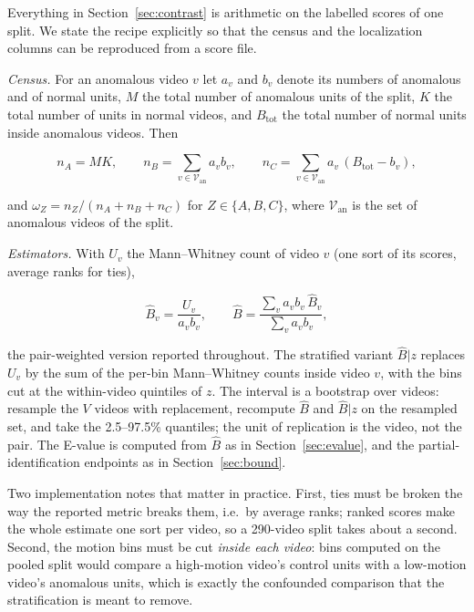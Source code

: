 \documentclass[number,preprint,12pt]{elsarticle}
\begin{document}
Everything in Section~\ref{sec:contrast} is arithmetic on the labelled scores of
one split. We state the recipe explicitly so that the census and the localization
columns can be reproduced from a score file.

\emph{Census.} For an anomalous video \(v\) let \(a_v\) and \(b_v\) denote its numbers of
anomalous and of normal units, \(M\) the total number of anomalous units of the
split, \(K\) the total number of units in normal videos, and \(B_{\mathrm{tot}}\) the
total number of normal units inside anomalous videos. Then

\begin{equation}
n_A=MK,\qquad
n_B=\sum_{v\in\mathcal{V}_{\mathrm{an}}} a_v b_v,\qquad
n_C=\sum_{v\in\mathcal{V}_{\mathrm{an}}} a_v\,(B_{\mathrm{tot}}-b_v),
\end{equation}

\noindent and \(\omega_Z=n_Z/(n_A+n_B+n_C)\) for \(Z\in\{A,B,C\}\), where
\(\mathcal{V}_{\mathrm{an}}\) is the set of anomalous videos of the split.

\emph{Estimators.} With \(U_v\) the Mann--Whitney count of video \(v\) (one sort of its
scores, average ranks for ties),

\begin{equation}
\hat{B}_v=\frac{U_v}{a_v b_v},\qquad
\hat{B}=\frac{\sum_v a_v b_v\,\hat{B}_v}{\sum_v a_v b_v},
\end{equation}

\noindent the pair-weighted version reported throughout. The stratified variant
\(\hat{B}|z\) replaces \(U_v\) by the sum of the per-bin Mann--Whitney counts
inside video \(v\), with the bins cut at the within-video quintiles of \(z\). The
interval is a bootstrap over videos: resample the \(V\) videos with replacement,
recompute \(\hat{B}\) and \(\hat{B}|z\) on the resampled set, and take the
2.5--97.5\% quantiles; the unit of replication is the video, not the pair. The
E-value is computed from \(\hat{B}\) as in Section~\ref{sec:evalue}, and the
partial-identification endpoints as in Section~\ref{sec:bound}.

Two implementation notes that matter in practice. First, ties must be broken the
way the reported metric breaks them, i.e.~by average ranks; ranked scores make
the whole estimate one sort per video, so a 290-video split takes about a second.
Second, the motion bins must be cut \emph{inside each video}: bins computed on the
pooled split would compare a high-motion video's control units with a low-motion
video's anomalous units, which is exactly the confounded comparison that the
stratification is meant to remove.
\end{document}
